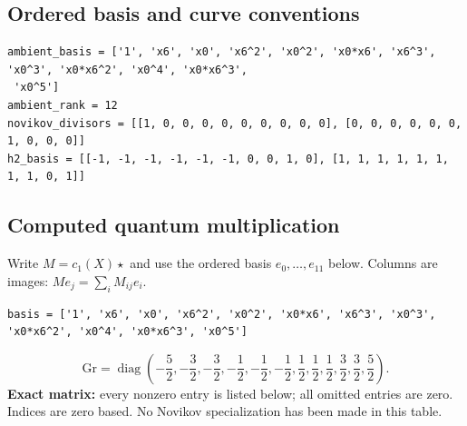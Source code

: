 \documentclass[10pt,a4paper]{article}
\begin{document}
\subsection*{Ordered basis and curve conventions}
\begin{lstlisting}
ambient_basis = ['1', 'x6', 'x0', 'x6^2', 'x0^2', 'x0*x6', 'x6^3', 'x0^3', 'x0*x6^2', 'x0^4', 'x0*x6^3',
 'x0^5']
ambient_rank = 12
novikov_divisors = [[1, 0, 0, 0, 0, 0, 0, 0, 0, 0], [0, 0, 0, 0, 0, 0, 1, 0, 0, 0]]
h2_basis = [[-1, -1, -1, -1, -1, -1, 0, 0, 1, 0], [1, 1, 1, 1, 1, 1, 1, 1, 0, 1]]
\end{lstlisting}
\subsection*{Computed quantum multiplication}
Write $M=c_1(X)\star$ and use the ordered basis $e_0,\ldots,e_{11}$ below. Columns are images: $M e_j=\sum_i M_{ij}e_i$.
\begin{lstlisting}
basis = ['1', 'x6', 'x0', 'x6^2', 'x0^2', 'x0*x6', 'x6^3', 'x0^3', 'x0*x6^2', 'x0^4', 'x0*x6^3', 'x0^5']
\end{lstlisting}
\[\mathrm{Gr}=\operatorname{diag}\!\left(- \frac{5}{2},- \frac{3}{2},- \frac{3}{2},- \frac{1}{2},- \frac{1}{2},- \frac{1}{2},\frac{1}{2},\frac{1}{2},\frac{1}{2},\frac{3}{2},\frac{3}{2},\frac{5}{2}\right).\]
\textbf{Exact matrix:} every nonzero entry is listed below; all omitted entries are zero. Indices are zero based. No Novikov specialization has been made in this table.
\end{document}
